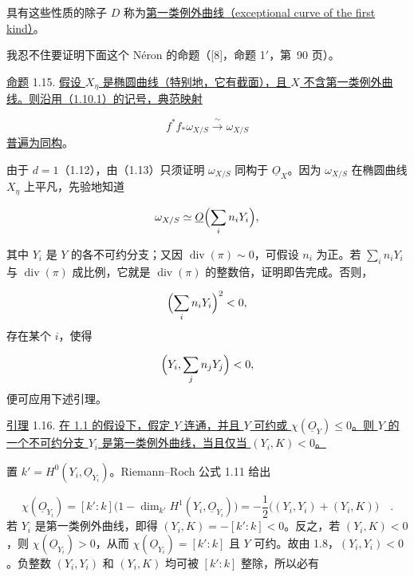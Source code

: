 具有这些性质的除子 $D$ 称为\underline{第一类例外曲线（exceptional curve of the first kind）}。

我忍不住要证明下面这个 Néron 的命题（[8]，命题 1$'$，第~90 页）。

\underline{命题} 1.15. \underline{假设 $X_\eta$ 是椭圆曲线（特别地，它有截面），且 $X$ 不含第一类例外曲线。则沿用（1.10.1）的记号，典范映射}

\begin{equation*}
f^*f_*\omega_{X/S}\xrightarrow{\;\sim\;}\omega_{X/S}
\end{equation*}
\underline{普遍为同构}。

由于 $d=1$（1.12），由（1.13）只须证明 $\omega_{X/S}$ 同构于 $\underline{O}_X$。因为 $\omega_{X/S}$ 在椭圆曲线 $X_\eta$ 上平凡，先验地知道

\begin{equation*}
\omega_{X/S}\simeq\underline{O}\Bigl(\sum_i n_iY_i\Bigr),
\end{equation*}


其中 $Y_i$ 是 $Y$ 的各不可约分支；又因 $\operatorname{div}(\pi)\sim0$，可假设 $n_i$ 为正。若 $\sum_i n_iY_i$ 与 $\operatorname{div}(\pi)$ 成比例，它就是 $\operatorname{div}(\pi)$ 的整数倍，证明即告完成。否则，

\begin{equation*}
\Bigl(\sum_i n_iY_i\Bigr)^2<0,
\end{equation*}
存在某个 $i$，使得

\begin{equation*}
\Bigl(Y_i,\sum_j n_jY_j\Bigr)<0,
\end{equation*}
便可应用下述引理。

\underline{引理} 1.16. \underline{在 1.1 的假设下，假定 $Y$ 连通，并且 $Y$ 可约或 $\chi(\underline{O}_Y)\leq0$。则 $Y$ 的一个不可约分支 $Y_i$ 是第一类例外曲线，当且仅当 $(Y_i,K)<0$。}

置 $k'=H^0(Y_i,\underline{O}_{Y_i})$。Riemann--Roch 公式 1.11 给出

\begin{equation*}
\chi(\underline{O}_{Y_i})
=[k':k]\bigl(1-\dim_{k'}H^1(Y_i,\underline{O}_{Y_i})\bigr)
=-\frac12\bigl((Y_i,Y_i)+(Y_i,K)\bigr) \quad .
\end{equation*}
若 $Y_i$ 是第一类例外曲线，即得 $(Y_i,K)=-[k':k]<0$。反之，若 $(Y_i,K)<0$，则 $\chi(\underline{O}_{Y_i})>0$，从而 $\chi(\underline{O}_{Y_i})=[k':k]$ 且 $Y$ 可约。故由 1.8，$(Y_i,Y_i)<0$。负整数 $(Y_i,Y_i)$ 和 $(Y_i,K)$ 均可被 $[k':k]$ 整除，所以必有

